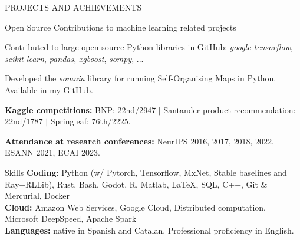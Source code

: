 \documentclass{resume} %
\begin{document}
\begin{rSection}{PROJECTS AND ACHIEVEMENTS}
\begin{rSubsection}{Open Source Contributions to machine learning related projects}
	\vspace{-3pt}

	\item Contributed to large open source Python libraries in GitHub: \textit{google tensorflow}, \textit{scikit-learn}, \textit{pandas}, \textit{xgboost}, \textit{sompy}, ...
	\item Developed the \textit{somnia} library for running Self-Organising Maps in Python. Available in my GitHub.
\end{rSubsection}

\vspace{-6pt}

\textbf{Kaggle competitions:} BNP: 22nd/2947 $|$ Santander product recommendation: 22nd/1787 $|$ Springleaf: 76th/2225.

\vspace{-6pt}

\textbf{Attendance at research conferences:} NeurIPS 2016, 2017, 2018, 2022, ESANN 2021, ECAI 2023.


\end{rSection}



\begin{rSection}{Skills} \itemsep -3pt
{\textbf{Coding}: Python (w/ Pytorch, Tensorflow, MxNet, Stable baselines and Ray+RLLib), Rust, Bash, Godot, R, Matlab, \LaTeX, SQL, C++, Git \& Mercurial, Docker}  \\
{\textbf{Cloud:} Amazon Web Services, Google Cloud, Distributed computation, Microsoft DeepSpeed, Apache Spark} \\
{\textbf{Languages:} native in Spanish and Catalan. Professional proficiency in English.}
\end{rSection}
\end{document}
